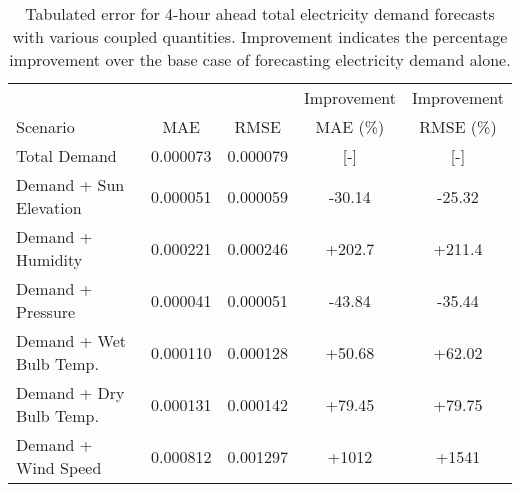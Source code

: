   \begin{table*}[t]
    \centering
    \caption{Tabulated error for 4-hour ahead total electricity demand forecasts with various coupled quantities. Improvement indicates the percentage improvement over the base case of forecasting electricity demand alone.}
    \label{tab:demand04}
    \begin{tabular}{l|c|c|c|c}
      &  & & Improvement & Improvement \\
      Scenario  & MAE & RMSE & MAE (\%) & RMSE (\%)\\
      \hline
      Total Demand & 0.000073 & 0.000079 & [-] & [-] \\
      Demand + Sun Elevation & 0.000051 & 0.000059 & -30.14 & -25.32\\
      Demand + Humidity & 0.000221 & 0.000246 & +202.7 & +211.4\\
      Demand + Pressure & 0.000041 & 0.000051 & -43.84 & -35.44\\
      Demand + Wet Bulb Temp. & 0.000110 & 0.000128 & +50.68& +62.02\\
      Demand + Dry Bulb Temp. & 0.000131 & 0.000142 & +79.45& +79.75\\
      Demand + Wind Speed & 0.000812 & 0.001297 & +1012& +1541\\
    \end{tabular}
  \end{table*}
